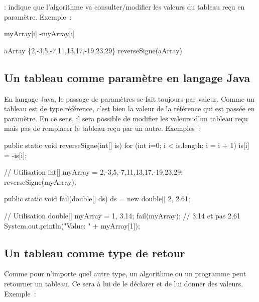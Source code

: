 		\In\Out : indique que l’algorithme va consulter/modifier les valeurs du
		tableau reçu en paramètre. Exemple~:
			
		\begin{pseudocode}
					\Let myArray[i] \Gets -myArray[i]
				\EndFor
			\EndAlgo 

			\Empty
			\Let aArray \Gets	
				{}
				\{2,-3,5,-7,11,13,17,-19,23,29\}
			\Stmt reverseSigne(aArray)
		\end{pseudocode}


		\subsection{Un tableau comme paramètre en langage Java}

		En langage Java, le passage de paramètres se fait toujours par valeur.
		Comme un tableau est de type référence, c'est bien la valeur de la
		référence qui est passée en paramètre. En ce sens, il sera possible de
		modifier les valeurs d'un tableau reçu mais pas de remplacer le tableau
		reçu par un autre. Exemples~:

\begin{java}
	public static void reverseSigne(int[] is){
		for (int i=0; i < is.length; i = i + 1){
			is[i] = -is[i];
		}
	}

	// Utilisation
	int[] myArray = {2,-3,5,-7,11,13,17,-19,23,29};
	reverseSigne(myArray);
\end{java}

\begin{java}
	public static void fail(double[] ds){
		ds = new double[] {2, 2.61};
	}


	// Utilisation
	double[] myArray = {1, 3.14};
	fail(myArray);
	// 3.14 et pas 2.61
	System.out.println("Value: " + myArray[1]);		

\end{java}



		\subsection{Un tableau comme type de retour}

		Comme pour n’importe quel autre type, un algorithme ou un programme peut
		retourner un tableau.  Ce sera à lui de le déclarer et de lui donner des
		valeurs.  Exemple~:
			

